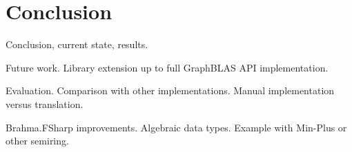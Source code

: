 \section{Conclusion}

Conclusion, current state, results.

Future work. Library extension up to full GraphBLAS API implementation.

Evaluation. Comparison with other implementations. Manual implementation versus translation.  

Brahma.FSharp improvements. 
Algebraic data types. Example with Min-Plus or other semiring. 